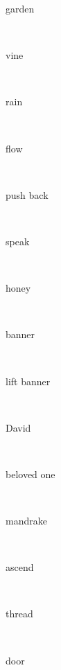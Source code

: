 \documentclass[a4paper]{article}
\begin{document}
\begin{multicols}{4}
\begin{multicols}{4}
\begin{multicols}{5}
{\hebrewfont{}} \begin{english}garden\end{english}\\
{\hebrewfont{}} \begin{english}vine\end{english}\\
{\hebrewfont{}} \begin{english}rain\end{english}\\
{\hebrewfont{}} \begin{english}flow\end{english}\\
{\hebrewfont{}} \begin{english}push back\end{english}\\
{\hebrewfont{}} \begin{english}speak\end{english}\\
{\hebrewfont{}} \begin{english}honey\end{english}\\
{\hebrewfont{}} \begin{english}banner\end{english}\\
{\hebrewfont{}} \begin{english}lift banner\end{english}\\
{\hebrewfont{}} \begin{english}David\end{english}\\
{\hebrewfont{}} \begin{english}beloved one\end{english}\\
{\hebrewfont{}} \begin{english}mandrake\end{english}\\
{\hebrewfont{}} \begin{english}ascend\end{english}\\
{\hebrewfont{}} \begin{english}thread\end{english}\\
{\hebrewfont{}} \begin{english}door\end{english}\\

\end{multicols}
\end{multicols}
\end{multicols}
\end{document}

